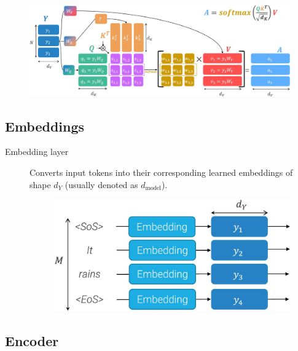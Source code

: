 \begin{description}
        \begin{figure}[H]
            \centering
            \includegraphics[width=0.8\linewidth]{./img/_self_attention.jpg}
        \end{figure}
\end{description}


\subsection{Embeddings}

\begin{description}
    \item[Embedding layer] 
        Converts input tokens into their corresponding learned embeddings of shape $d_Y$ (usually denoted as $d_\text{model}$).

        \begin{figure}[H]
            \centering
            \includegraphics[width=0.4\linewidth]{./img/_transformer_embeddings.jpg}
        \end{figure}
\end{description}


\subsection{Encoder}

